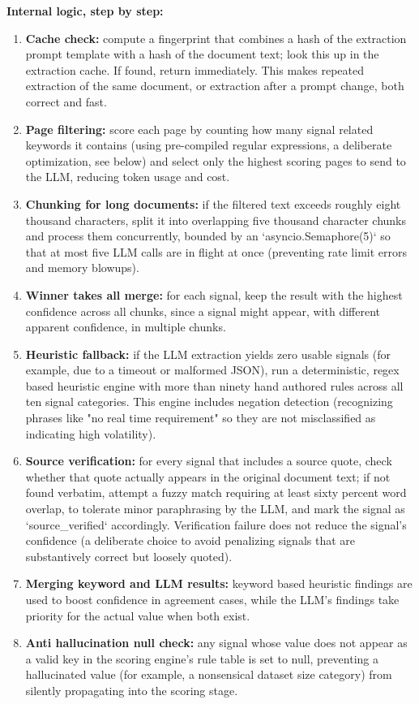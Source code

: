 \documentclass[11pt,a4paper]{report}
\begin{document}
\textbf{Internal logic, step by step:}
\begin{enumerate}[leftmargin=*]
  \item \textbf{Cache check:} compute a fingerprint that combines a hash of the extraction prompt template with a hash of the document text; look this up in the extraction cache. If found, return immediately. This makes repeated extraction of the same document, or extraction after a prompt change, both correct and fast.
  \item \textbf{Page filtering:} score each page by counting how many signal related keywords it contains (using pre-compiled regular expressions, a deliberate optimization, see below) and select only the highest scoring pages to send to the LLM, reducing token usage and cost.
  \item \textbf{Chunking for long documents:} if the filtered text exceeds roughly eight thousand characters, split it into overlapping five thousand character chunks and process them concurrently, bounded by an `asyncio.Semaphore(5)` so that at most five LLM calls are in flight at once (preventing rate limit errors and memory blowups).
  \item \textbf{Winner takes all merge:} for each signal, keep the result with the highest confidence across all chunks, since a signal might appear, with different apparent confidence, in multiple chunks.
  \item \textbf{Heuristic fallback:} if the LLM extraction yields zero usable signals (for example, due to a timeout or malformed JSON), run a deterministic, regex based heuristic engine with more than ninety hand authored rules across all ten signal categories. This engine includes negation detection (recognizing phrases like "no real time requirement" so they are not misclassified as indicating high volatility).
  \item \textbf{Source verification:} for every signal that includes a source quote, check whether that quote actually appears in the original document text; if not found verbatim, attempt a fuzzy match requiring at least sixty percent word overlap, to tolerate minor paraphrasing by the LLM, and mark the signal as `source_verified` accordingly. Verification failure does not reduce the signal's confidence (a deliberate choice to avoid penalizing signals that are substantively correct but loosely quoted).
  \item \textbf{Merging keyword and LLM results:} keyword based heuristic findings are used to boost confidence in agreement cases, while the LLM's findings take priority for the actual value when both exist.
  \item \textbf{Anti hallucination null check:} any signal whose value does not appear as a valid key in the scoring engine's rule table is set to null, preventing a hallucinated value (for example, a nonsensical dataset size category) from silently propagating into the scoring stage.
\end{enumerate}
\end{document}

